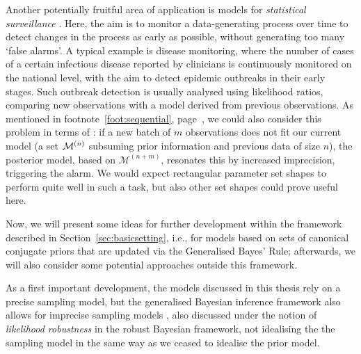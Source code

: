 Another potentially fruitful area of application is models for \emph{statistical surveillance}
\parencite[for a brief overview see, e.g.,][]{2011:IESS-surveillance}.
Here, the aim is to monitor a data-generating process over time
to detect changes in the process as early as possible,
without generating too many `false alarms'.
A typical example is disease monitoring,
where the number of cases of a certain infectious disease reported by clinicians
is continuously monitored on the national level,
with the aim to detect epidemic outbreaks in their early stages.
Such outbreak detection is usually analysed using likelihood ratios,
comparing new observations with a model derived from previous observations. 
As mentioned in footnote~\ref{foot:sequential}, page~\pageref{foot:sequential},
we could also consider this problem in terms of \pdc:
if a new batch of $m$ observations does not fit our current model
(a set $\mathcal{M}^{(n)}$ subsuming prior information and previous data of size $n$),
the posterior model, based on $\mathcal{M}^{(n+m)}$, resonates this by increased imprecision,
triggering the alarm.
We would expect rectangular parameter set shapes to perform quite well in such a task,
but also other set shapes could prove useful here.

\medskip

Now, we will present some ideas for further development within the framework
described in Section~\ref{sec:basicsetting}, i.e.,
for models based on sets of canonical conjugate priors
that are updated via the Generalised Bayes' Rule;
afterwards, we will also consider some potential approaches outside this framework.

As a first important development,
the models discussed in this thesis rely on a precise sampling model,
but the generalised Bayesian inference framework also allows for imprecise sampling models
\parencite[see, in particular,][\S 8.5]{1991:walley},
also discussed under the notion of \emph{likelihood robustness} \parencite[e.g.,][]{2000:shyamalkumar} in the robust Bayesian framework,
not idealising the the sampling model in the same way as we ceased to idealise the prior model.

